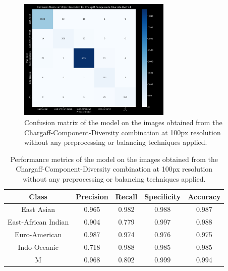 \begin{figure}[H]
	\centering
	\includegraphics[width=0.65\textwidth]{../imgs/graphs/standard/cnn_confusion_matrix_100px_mask_5_std-old.png}
	\caption{Confusion matrix of the model on the images obtained from the Chargaff-Component-Diversity combination at 100px resolution without any
		preprocessing or balancing techniques applied.}
	\label{fig:cnn_confusion_matrix_100px_std}
\end{figure}

\begin{table}[H]
	\centering
	\begin{tabular}{|c|c|c|c|c|}
		\hline
		\textbf{Class}      & \textbf{Precision} & \textbf{Recall} & \textbf{Specificity} & \textbf{Accuracy} \\
		\hline
		East Asian          & 0.965              & 0.982           & 0.988                & 0.987             \\
		East-African Indian & 0.904              & 0.779           & 0.997                & 0.988             \\
		Euro-American       & 0.987              & 0.974           & 0.976                & 0.975             \\
		Indo-Oceanic        & 0.718              & 0.988           & 0.985                & 0.985             \\
		M                   & 0.968              & 0.802           & 0.999                & 0.994             \\
		\hline
	\end{tabular}
	\caption{Performance metrics of the model on the images obtained from the Chargaff-Component-Diversity combination at 100px resolution without any
		preprocessing or balancing techniques applied.}
	\label{tab:performance_metrics_100px_std}
\end{table}

